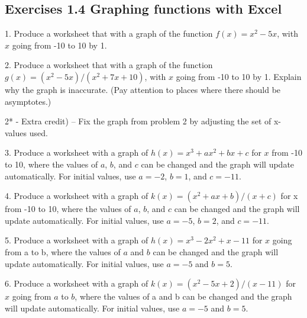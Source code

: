 \documentclass[10pt,]{book}
\theoremstyle{plain}
\theoremstyle{definition}
\theoremstyle{definition}
\begin{document}
\subsection[{Exercises 1.4 Graphing functions with Excel}]{Exercises 1.4 Graphing functions with Excel}\label{exercises-set-sec-1-4}
\begin{exerciselist}
\item[1.]\hypertarget{exercise-53}{} Produce a worksheet that with a graph of the function \(f(x) = x^2 - 5 x\), with \(x\) going from -10 to 10 by 1.
%
\par\smallskip
\item[2.]\hypertarget{exercise-54}{} Produce a worksheet that with a graph of the function 
\(g(x) = (x^2 - 5 x)/(x^2 + 7 x + 10)\), with \(x\) going from -10 to 10 by 1.  Explain why the graph is inaccurate.  (Pay attention to places where there should be asymptotes.)%
\par
2* - Extra credit) – Fix the graph from problem 2 by adjusting the set of x-values used.
%
\par\smallskip
\item[3.]\hypertarget{exercise-55}{} Produce a worksheet with a graph of \(h(x) = x^3 + a x^2 + b x + c\) for \(x\) from -10 to 10, where the values of \(a\), \(b\), and \(c\) can be changed and the graph will update automatically.  For initial values, use \(a = -2\), \(b = 1\), and \(c = -11\).
%
\par\smallskip
\item[4.]\hypertarget{exercise-56}{} Produce a worksheet with a graph of \(k(x) = (x^2 + a x + b)/( x + c)\) for x from -10 to 10, where the values of \(a\), \(b\), and \(c\) can be changed and the graph will update automatically.  For initial values, use \(a = -5\), \(b = 2\), and \(c = -11\).
%
\par\smallskip
\item[5.]\hypertarget{exercise-57}{} Produce a worksheet with a graph of \(h(x) = x^3 -2 x^2 +  x -11\) for \(x\) going from a to b, where the values of \(a\) and \(b\) can be changed and the graph will update automatically.  For initial values, use \(a = -5\) and \(b = 5\).
%
\par\smallskip
\item[6.]\hypertarget{exercise-58}{} Produce a worksheet with a graph of \(k(x) = (x^2 -5 x + 2)/( x -11)\) for \(x\) going from \(a\) to \(b\), where the values of a and b can be changed and the graph will update automatically.  For initial values, use \(a = -5\) and \(b = 5\).
%
\par\smallskip

\end{exerciselist}
\end{document}
